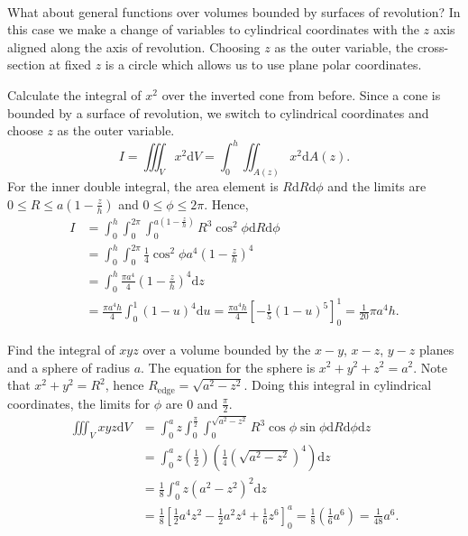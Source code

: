 \documentclass[../multivariate_calculus.tex]{subfiles}
\begin{document}
        \paragraph{}
        What about general functions over volumes bounded by surfaces of revolution?
        In this case we make a change of variables to cylindrical coordinates with the $z$ axis aligned along the axis of revolution.
        Choosing $z$ as the outer variable, the cross-section at fixed $z$ is a circle which allows us to use plane polar coordinates.
        \begin{example}
            Calculate the integral of $x^2$ over the inverted cone from before.
            Since a cone is bounded by a surface of revolution, we switch to cylindrical coordinates and choose $z$ as the outer variable.
            \begin{equation}
                I=\iiint_V x^2\mathrm{d}V=\int_0^h\iint_{A(z)}x^2\mathrm{d}A(z).
            \end{equation}
            For the inner double integral, the area element is $R\mathrm{d}R\mathrm{d}\phi$ and the limits are $0\leq R\leq a\left(1-\frac{z}{h}\right)$ and $0\leq\phi\leq2\pi$.
            Hence,
            \begin{align}
                I&=\int_0^h\int_0^{2\pi}\int_0^{a\left(1-\frac{z}{h}\right)}R^3\cos^2\phi\mathrm{d}R\mathrm{d}\phi\\
                &=\int_0^h\int_0^{2\pi}\frac{1}{4}\cos^2\phi a^4\left(1-\frac{z}{h}\right)^4\\
                &=\int_0^h\frac{\pi a^4}{4}\left(1-\frac{z}{h}\right)^4\mathrm{d}z\\
                &=\frac{\pi a^4h}{4}\int_0^1(1-u)^4\mathrm{d}u=\frac{\pi a^4h}{4}\left[-\frac{1}{5}(1-u)^5\right]_0^1=\frac{1}{20}\pi a^4h.
            \end{align}
        \end{example}
        \begin{example}
            Find the integral of $xyz$ over a volume bounded by the $x-y$, $x-z$, $y-z$ planes and a sphere of radius $a$.
            The equation for the sphere is $x^2+y^2+z^2=a^2$. Note that $x^2+y^2=R^2$, hence $R_\text{edge}=\sqrt{a^2-z^2}$.
            Doing this integral in cylindrical coordinates, the limits for $\phi$ are 0 and $\frac{\pi}{2}$.
            \begin{align}
                \iiint_V xyz\mathrm{d}V&=\int_0^a z\int_0^\frac{\pi}{2}\int_0^{\sqrt{a^2-z^2}}R^3\cos\phi\sin\phi\mathrm{d}R\mathrm{d}\phi\mathrm{d}z\\
                &=\int_0^a z\left(\frac{1}{2}\right)\left(\frac{1}{4}\left(\sqrt{a^2-z^2}\right)^4\right)\mathrm{d}z\\
                &=\frac{1}{8}\int_0^a z(a^2-z^2)^2\mathrm{d}z\\
                &=\frac{1}{8}\left[\frac{1}{2}a^4z^2-\frac{1}{2}a^2z^4+\frac{1}{6}z^6\right]_0^a=\frac{1}{8}\left(\frac{1}{6}a^6\right)=\frac{1}{48}a^6.
            \end{align}
        \end{example}
\end{document}
